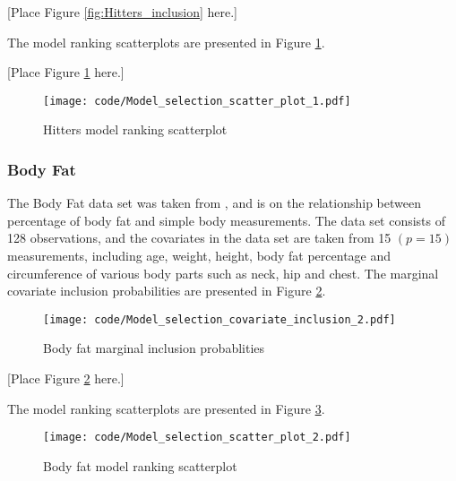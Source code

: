 \documentclass{amsart}[12pt]
\begin{document}
[Place Figure \ref{fig:Hitters_inclusion} here.]

The model ranking scatterplots are presented in Figure \ref{fig:Hitters_model_ranking}.

[Place Figure \ref{fig:Hitters_model_ranking} here.]

\begin{figure}[p]
	\texttt{[image: code/Model\_selection\_scatter\_plot\_1.pdf]}
	\caption{Hitters model ranking scatterplot}
	\label{fig:Hitters_model_ranking}
\end{figure}

\subsubsection{Body Fat}

The Body Fat data set was taken from \cite{Tarr2015}, and is on the relationship between percentage of body
fat and simple body measurements. The data set consists of 128 observations, and the covariates in the data
set are taken from 15 $(p=15)$ measurements, including age, weight, height, body fat percentage and
circumference of various body parts such as neck, hip and chest. The marginal covariate inclusion
probabilities are presented in Figure \ref{fig:bodyfat_inclusion}.


\begin{figure}[p]
	\texttt{[image: code/Model\_selection\_covariate\_inclusion\_2.pdf]}
	\caption{Body fat marginal inclusion probablities}
	\label{fig:bodyfat_inclusion}
\end{figure}

[Place Figure \ref{fig:bodyfat_inclusion} here.]

The model ranking scatterplots are presented in Figure \ref{fig:bodyfat_model_ranking}.

\begin{figure}[p]
	\texttt{[image: code/Model\_selection\_scatter\_plot\_2.pdf]}
	\caption{Body fat model ranking scatterplot}
	\label{fig:bodyfat_model_ranking}
\end{figure}
\end{document}
